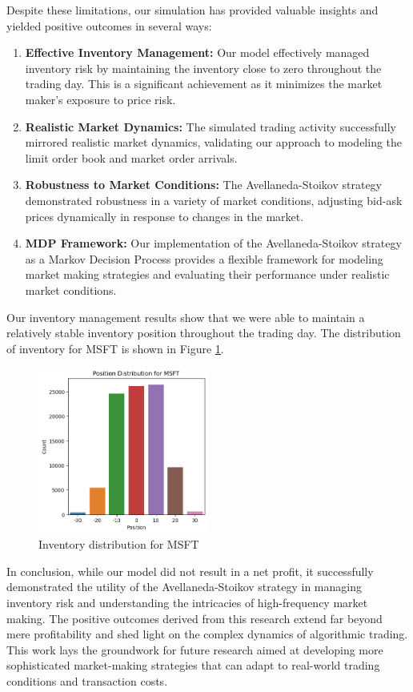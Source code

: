\documentclass[letterpaper, 10 pt, conference]{ieeeconf}  %
\begin{document}
Despite these limitations, our simulation has provided valuable insights and yielded positive outcomes in several ways:
\begin{enumerate}
        \item \textbf{Effective Inventory Management:} Our model effectively managed inventory risk by maintaining the inventory close to zero throughout the trading day. This is a significant achievement as it minimizes the market maker's exposure to price risk.
        \item \textbf{Realistic Market Dynamics:} The simulated trading activity successfully mirrored realistic market dynamics, validating our approach to modeling the limit order book and market order arrivals.
        \item \textbf{Robustness to Market Conditions:} The Avellaneda-Stoikov strategy demonstrated robustness in a variety of market conditions, adjusting bid-ask prices dynamically in response to changes in the market.
        \item \textbf{MDP Framework:} Our implementation of the Avellaneda-Stoikov strategy as a Markov Decision Process provides a flexible framework for modeling market making strategies and evaluating their performance under realistic market conditions.
\end{enumerate}

Our inventory management results show that we were able to maintain a relatively stable inventory position throughout the trading day. The distribution of inventory for MSFT is shown in Figure \ref{fig:msft_inventory}.

\begin{figure}[h]
\centering
\includegraphics[width=0.5\textwidth]{msft_inventory.png}
\caption{Inventory distribution for MSFT}
\label{fig:msft_inventory}
\end{figure}


In conclusion, while our model did not result in a net profit, it successfully demonstrated the utility of the Avellaneda-Stoikov strategy in managing inventory risk and understanding the intricacies of high-frequency market making. The positive outcomes derived from this research extend far beyond mere profitability and shed light on the complex dynamics of algorithmic trading. This work lays the groundwork for future research aimed at developing more sophisticated market-making strategies that can adapt to real-world trading conditions and transaction costs.
\end{document}
